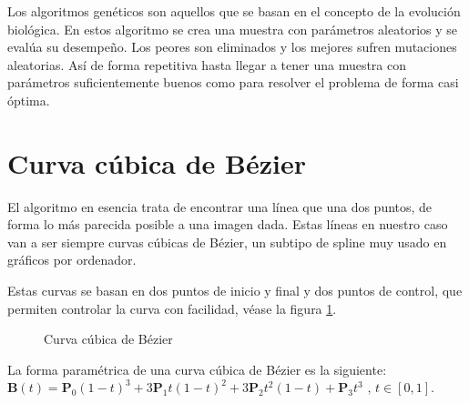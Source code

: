 \documentclass{report}
\begin{document}
Los algoritmos genéticos son aquellos que se basan en el concepto de la evolución biológica.
En estos algoritmo se crea una muestra con parámetros aleatorios y se evalúa su desempeño.
Los peores son eliminados y los mejores sufren mutaciones aleatorias. Así de forma repetitiva hasta
llegar a tener una muestra con parámetros suficientemente buenos como para resolver el problema de 
forma casi óptima.

\section{Curva cúbica de Bézier}

El algoritmo en esencia trata de encontrar una línea que una dos puntos, de forma lo más parecida
posible a una imagen dada. Estas líneas en nuestro caso van a ser siempre curvas cúbicas de Bézier,
un subtipo de spline muy usado en gráficos por ordenador.\cite{wiki:bezier}

Estas curvas se basan en dos puntos de inicio y final y dos puntos de control, que permiten controlar
la curva con facilidad, véase la figura \ref{fig:bezier}.

\begin{figure}
	\caption{\label{fig:bezier} Curva cúbica de Bézier}
\end{figure}

La forma paramétrica de una curva cúbica de Bézier es la siguiente:  \\

\begin{math}
	\mathbf{B}(t)=\mathbf{P}_0(1-t)^3+3\mathbf{P}_1t(1-t)^2+3\mathbf{P}_2t^2(1-t)+\mathbf{P}_3t^3 \mbox{ , } t \in [0,1].
\end{math}
\end{document}
